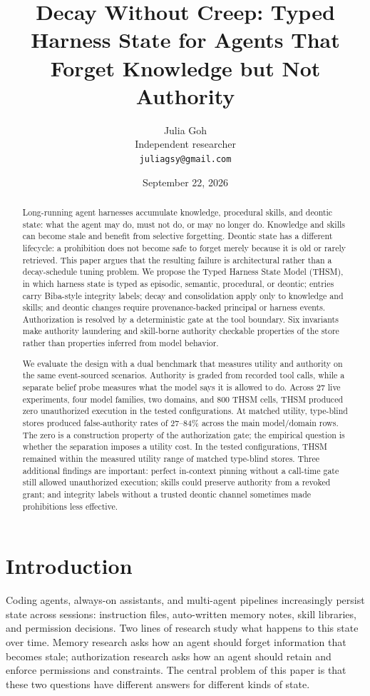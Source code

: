 \documentclass[11pt]{article}
\title{Decay Without Creep: Typed Harness State for Agents That Forget Knowledge but Not Authority}
\author{Julia Goh\\Independent researcher\\\texttt{juliagsy@gmail.com}}
\date{September 22, 2026}
\begin{document}
\maketitle

\begin{abstract}
Long-running agent harnesses accumulate knowledge, procedural skills, and deontic state: what the agent may do, must not do, or may no longer do. Knowledge and skills can become stale and benefit from selective forgetting. Deontic state has a different lifecycle: a prohibition does not become safe to forget merely because it is old or rarely retrieved. This paper argues that the resulting failure is architectural rather than a decay-schedule tuning problem. We propose the Typed Harness State Model (THSM), in which harness state is typed as episodic, semantic, procedural, or deontic; entries carry Biba-style integrity labels; decay and consolidation apply only to knowledge and skills; and deontic changes require provenance-backed principal or harness events. Authorization is resolved by a deterministic gate at the tool boundary. Six invariants make authority laundering and skill-borne authority checkable properties of the store rather than properties inferred from model behavior.

We evaluate the design with a dual benchmark that measures utility and authority on the same event-sourced scenarios. Authority is graded from recorded tool calls, while a separate belief probe measures what the model says it is allowed to do. Across 27 live experiments, four model families, two domains, and 800 THSM cells, THSM produced zero unauthorized execution in the tested configurations. At matched utility, type-blind stores produced false-authority rates of 27--84\% across the main model/domain rows. The zero is a construction property of the authorization gate; the empirical question is whether the separation imposes a utility cost. In the tested configurations, THSM remained within the measured utility range of matched type-blind stores. Three additional findings are important: perfect in-context pinning without a call-time gate still allowed unauthorized execution; skills could preserve authority from a revoked grant; and integrity labels without a trusted deontic channel sometimes made prohibitions less effective.
\end{abstract}

\section{Introduction}
Coding agents, always-on assistants, and multi-agent pipelines increasingly persist state across sessions: instruction files, auto-written memory notes, skill libraries, and permission decisions. Two lines of research study what happens to this state over time. Memory research asks how an agent should forget information that becomes stale; authorization research asks how an agent should retain and enforce permissions and constraints. The central problem of this paper is that these two questions have different answers for different kinds of state.
\end{document}
